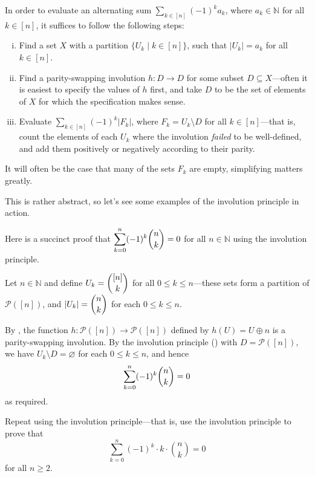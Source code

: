 \begin{strategy}
\label{strInvolutionPrinciple}
In order to evaluate an alternating sum $\displaystyle \sum_{k \in [n]} (-1)^k a_k$, where $a_k \in \mathbb{N}$ for all $k \in [n]$, it suffices to follow the following steps:
\begin{enumerate}[(i)]
\item Find a set $X$ with a partition $\{ U_k \mid k \in [n] \}$, such that $|U_k| = a_k$ for all $k \in [n]$.
\item Find a parity-swapping involution $h : D \to D$ for some subset $D \subseteq X$---often it is easiest to specify the values of $h$ first, and take $D$ to be the set of elements of $X$ for which the specification makes sense.
\item Evaluate $\displaystyle \sum_{k \in [n]} (-1)^k |F_k|$, where $F_k = U_k \setminus D$ for all $k \in [n]$---that is, count the elements of each $U_k$ where the involution \textit{failed} to be well-defined, and add them positively or negatively according to their parity.
\end{enumerate}
It will often be the case that many of the sets $F_k$ are empty, simplifying matters greatly.
\end{strategy}

This is rather abstract, so let's see some examples of the involution principle in action.

\begin{example}
\label{exAlternatingSumOfBinomialsByInvolution}
Here is a succinct proof that $\displaystyle \sum_{k=0}^n (-1)^k \dbinom{n}{k} = 0$ for all $n \in \mathbb{N}$ using the involution principle.

Let $n \in \mathbb{N}$ and define $U_k = \dbinom{[n]}{k}$ for all $0 \le k \le n$---these sets form a partition of $\mathcal{P}([n])$, and $|U_k| = \dbinom{n}{k}$ for each $0 \le k \le n$.

By , the function $h : \mathcal{P}([n]) \to \mathcal{P}([n])$ defined by $h(U) = U \oplus n$ is a parity-swapping involution. By the involution principle () with $D=\mathcal{P}([n])$, we have $U_k \setminus D = \varnothing$ for each $0 \le k \le n$, and hence
\[ \sum_{k=0}^n (-1)^k \dbinom{n}{k} = 0 \]
as required.
\end{example}

\begin{exercise}
Repeat  using the involution principle---that is, use the involution principle to prove that
\[ \sum_{k=0}^n (-1)^k \cdot k \cdot \binom{n}{k} = 0 \]
for all $n \ge 2$.
\end{exercise}

